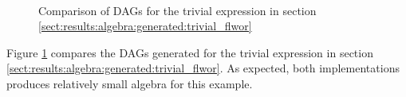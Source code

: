 \begin{figure}[!h]
	\centering
	\mbox{
		\quad
	}
	\caption{Comparison of DAGs for the trivial expression in section
	\ref{sect:results:algebra:generated:trivial_flwor}}
	\label{fig:results:comp:trivial}
\end{figure}

Figure \ref{fig:results:comp:trivial} compares the DAGs generated for the
trivial expression in section
\ref{sect:results:algebra:generated:trivial_flwor}. As expected, both
implementations produces relatively small algebra for this example.


